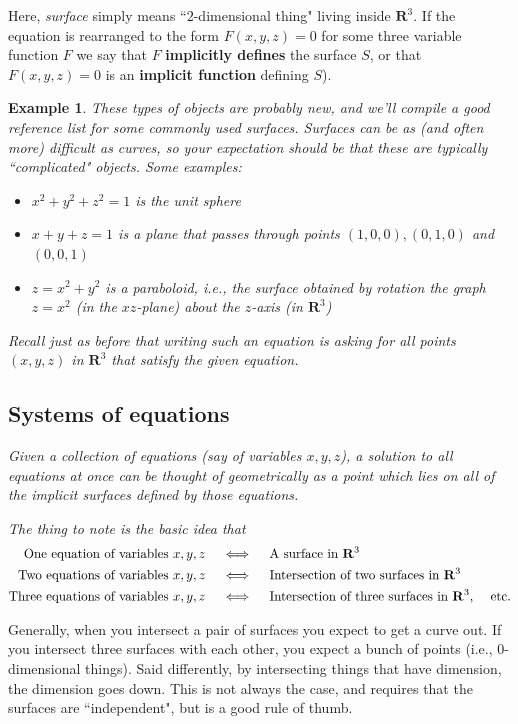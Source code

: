 \documentclass[12pt]{article}
\numberwithin{equation}{subsection}
\numberwithin{figure}{subsection}
\theoremstyle{note}
\newtheorem{example}[subsection]{Example}
\begin{document}
{Here, \textit{surface} simply means ``$2$-dimensional thing" living inside $\mathbf{R}^3$. If the equation is rearranged to the form $F(x,y,z)=0$ for some three variable function $F$ we say that $F$ \textbf{implicitly defines} the surface $S$, or that $F(x,y,z)=0$ is an \textbf{implicit function} defining $S$). 
 
\begin{example}These types of objects are probably new, and we'll compile a good reference list for some commonly used surfaces. Surfaces can be as (and often more) difficult as curves, so your expectation should be that these are typically ``complicated" objects. Some examples: \begin{itemize}
	\item $x^2+y^2+z^2=1$ is the unit sphere
	\item $x+y+z=1$ is a plane that passes through points $(1,0,0), (0,1,0)$ and $(0,0,1)$
	\item $z=x^2+y^2$ is a \textit{paraboloid}, i.e., the surface obtained by rotation the graph $z=x^2$ (in the $xz$-plane) about the $z$-axis (in $\mathbf{R}^3$)
\end{itemize}
Recall just as before that writing such an equation is asking for all points $(x,y,z)$ in $\mathbf{R}^3$ that satisfy the given equation. 

\subsection{Systems of equations}
Given a collection of equations (say of variables $x,y,z$), a solution to \textit{all} equations at once can be thought of geometrically as a point which lies on all of the implicit surfaces defined by those equations. 

The thing to note is the basic idea that\begin{align*} \text{One equation of variables $x,y,z$} \quad &\iff \quad \text{A surface in $\mathbf{R}^3$}  \\ 
\text{Two equations of variables $x,y,z$} \quad & \iff \quad \text{Intersection of two surfaces in $\mathbf{R}^3$}\\
\text{Three equations of variables $x,y,z$} \quad & \iff \quad \text{Intersection of three surfaces in $\mathbf{R}^3$, \quad etc.}
\end{align*}
\end{example}

Generally, when you intersect a pair of surfaces you expect to get a curve out. If you intersect three surfaces with each other, you expect a bunch of points (i.e., $0$-dimensional things). Said differently, by intersecting things that have dimension, the dimension goes down. This is not always the case, and requires that the surfaces are ``independent", but is a good rule of thumb.
 
}
\end{document}
